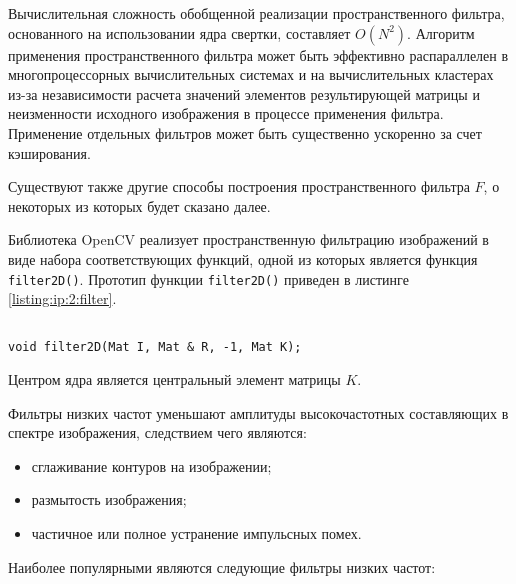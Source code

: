 Вычислительная сложность обобщенной реализации пространственного фильтра, основанного на использовании ядра свертки, составляет $O(N^2)$. Алгоритм применения пространственного фильтра может быть эффективно распараллелен в многопроцессорных вычислительных системах и на вычислительных кластерах из-за независимости расчета значений элементов результирующей матрицы и неизменности исходного изображения в процессе применения фильтра. Применение отдельных фильтров может быть существенно ускоренно за счет кэширования.

Существуют также другие способы построения пространственного фильтра $F$, о некоторых из которых будет сказано далее.

Библиотека OpenCV реализует пространственную фильтрацию изображений в виде набора соответствующих функций, одной из которых является функция \verb|filter2D()|. Прототип функции \verb|filter2D()| приведен в листинге \ref{listing:ip:2:filter}.

\begin{lstlisting}

void filter2D(Mat I, Mat & R, -1, Mat K);

\end{lstlisting}
\mylistingend

Центром ядра является центральный элемент матрицы $K$.


Фильтры низких частот уменьшают амплитуды высокочастотных составляющих в спектре изображения, следствием чего являются:

\begin{itemize}

	\item сглаживание контуров на изображении;
	\item размытость изображения;
	\item частичное или полное устранение импульсных помех.

\end{itemize}

Наиболее популярными являются следующие фильтры низких частот:


